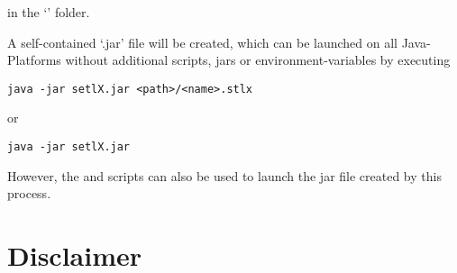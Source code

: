 in the `' folder.

A self-contained `.jar' file will be created, which can be launched on all Java-Platforms without additional scripts, jars or environment-variables by executing

\begin{lstlisting}[frame=none,numbers=none]
java -jar setlX.jar <path>/<name>.stlx
\end{lstlisting}

or

\begin{lstlisting}[frame=none,numbers=none]
java -jar setlX.jar
\end{lstlisting}

However, the  and  scripts can also be used to launch the jar file created by this process.

\section{Disclaimer}



